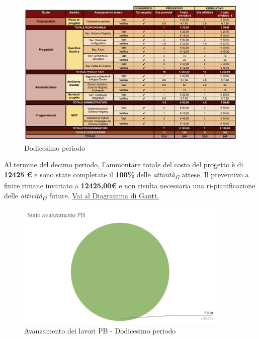 \vspace{0.4cm}

\begin{figure}[H]
    \centering
    \includegraphics[height=0.6\textwidth]{../Images/tabG12.png}
    \caption{Dodicesimo periodo}
    \label{fig:Dodicesimo_periodo}
\end{figure}

Al termine del decimo periodo, l'ammontare totale del costo del progetto è di \textbf{12425 \euro} e sono state completate il \textbf{100\%} delle \textit{attività}\textsubscript{\textit{G}} attese.
Il preventivo a finire rimane invariato a \textbf{12425,00\euro} e non risulta necessaria una ri-pianificazione delle \textit{attività}\textsubscript{\textit{G}} future.
\href{https://github.com/orgs/ByteOps-swe/projects/3/views/1?sortedBy%5Bdirection%5D=asc&sortedBy%5BcolumnId%5D=64182560}{Vai al Diagramma di Gantt.}

\begin{figure}[H]
    \centering
    \begin{minipage}[b]{0.70\textwidth}
        \centering
        \includegraphics[width=0.9\textwidth]{../Images/torta12.png}
        \caption{Avanzamento dei lavori PB - Dodicesimo periodo}
        \label{fig:Avanzamento_PB_12}
    \end{minipage}
\end{figure}

